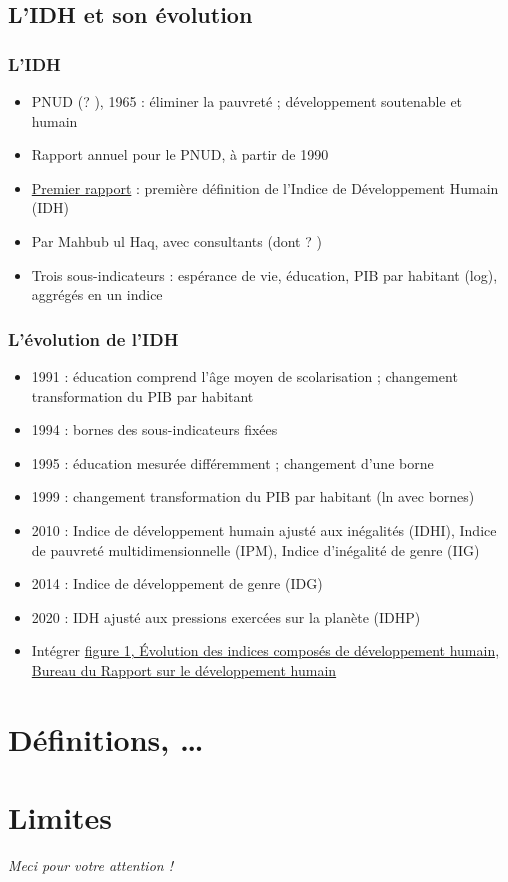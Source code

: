 \documentclass[french]{beamer}
\begin{document}
\subsection{L’IDH et son évolution}
\begin{frame}
	\frametitle{L’IDH}
	\begin{itemize}
		\item PNUD (? ), 1965 : éliminer la pauvreté ; développement soutenable et humain
		\item Rapport annuel pour le PNUD, à partir de 1990
		\item \href{https://hdr.undp.org/content/human-development-report-1990}{Premier rapport} : première définition de l’Indice de Développement Humain (IDH)
		\item Par Mahbub ul Haq, avec consultants (dont ? \onslide<3->{Amartya Sen})
		\item Trois sous-indicateurs : espérance de vie, éducation, PIB par habitant (log), aggrégés en un indice
	\end{itemize}
\end{frame}

\begin{frame}
	\frametitle{L’évolution de l’IDH}
	\begin{itemize}
		\item 1991 : éducation comprend l’âge moyen de scolarisation ; changement transformation du PIB par habitant
		\item 1994 : bornes des sous-indicateurs fixées
		\item 1995 : éducation mesurée différemment ; changement d’une borne
		\item 1999 : changement transformation du PIB par habitant (ln avec bornes)
		\item 2010 : Indice de développement humain ajusté aux inégalités (IDHI), Indice de pauvreté multidimensionnelle (IPM), Indice d’inégalité de genre (IIG)
		\item 2014 : Indice de développement de genre (IDG)
		\item 2020 : IDH ajusté aux pressions exercées sur la planète (IDHP) %
    \item Intégrer \href{https://hdr.undp.org/system/files/documents/2018humandevelopmentstatisticalupdatefr.pdf}{figure 1, Évolution des indices composés de développement humain, Bureau du Rapport sur le développement humain}
	\end{itemize}
\end{frame}

\section{Définitions, …}

\section{Limites}

\begin{frame}[plain]
	\addtocounter{framenumber}{-1}
	\begin{center}
		\huge
		\textit{Meci pour votre attention !}
	\end{center}
\end{frame}
\end{document}
